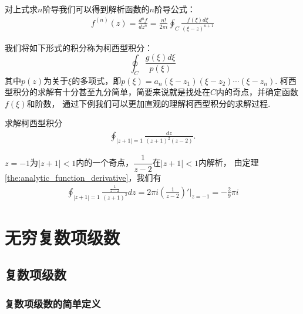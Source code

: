 \documentclass[lang=cn, titlestyle=display, scheme=chinese]{elegantbook}
\begin{document}
                \begin{theorem}[解析函数的高阶导数]\label{the:analytic_function_derivative}
                    对上式求$n$阶导我们可以得到解析函数的$n$阶导公式：
                    \begin{align*}
                        f^{(n)}(z) = \frac{d^n f}{dz^n} = \frac{n!}{2\pi i}\oint_C \frac{f(\xi)d\xi}{(\xi - z)^{n + 1}}
                    \end{align*}
                \end{theorem}

                我们将如下形式的积分称为柯西型积分：$$\oint_C \frac{g(\xi)d\xi}{p(\xi)}$$
                其中$p(z)$为关于$\xi$的多项式，即$p(\xi) = a_n(\xi - z_1)(\xi - z_2)\cdots(\xi - z_n)$.
                柯西型积分的求解有十分甚至九分简单，简要来说就是找处在$C$内的奇点，并确定函数$f(\xi)$和阶数，
                通过下例我们可以更加直观的理解柯西型积分的求解过程.
                \begin{example}
                    求解柯西型积分
                    \begin{align*}
                        \oint_{|z + 1| = 1}\frac{dz}{(z + 1)^2(z - 2)}.
                    \end{align*}
                \end{example}
                \begin{solution}
                    $z = -1$为$|z + 1| < 1$内的一个奇点，$\dfrac{1}{z - 2}$在$|z + 1| < 1$内解析，
                    由定理\ref{the:analytic_function_derivative}，我们有
                    \begin{align*}
                        \oint_{|z + 1| = 1}\frac{\frac{1}{z - 2}}{(z + 1)^2}dz = 2\pi i\left( \frac{1}{z - 2} \right)'\Bigg|_{z=-1} = -\frac{2}{9}\pi i
                    \end{align*}
                \end{solution}


    \chapter{无穷复数项级数}

        \section{复数项级数}
            \subsection{复数项级数的简单定义}
\end{document}
